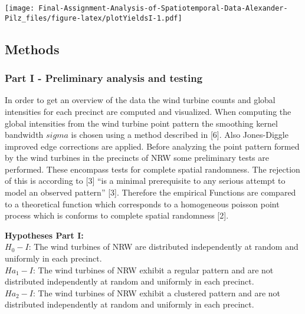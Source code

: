 \documentclass[
]{article}
\begin{document}
\texttt{[image: Final-Assignment-Analysis-of-Spatiotemporal-Data-Alexander-Pilz\_files/figure-latex/plotYieldsI-1.pdf]}

\hypertarget{methods}{%
\subsection{Methods}\label{methods}}

\hypertarget{part-i---preliminary-analysis-and-testing}{%
\subsubsection{Part I - Preliminary analysis and
testing}\label{part-i---preliminary-analysis-and-testing}}

In order to get an overview of the data the wind turbine counts and
global intensities for each precinct are computed and visualized. When
computing the global intensities from the wind turbine point pattern the
smoothing kernel bandwidth \(sigma\) is chosen using a method described
in {[}6{]}. Also Jones-Diggle improved edge corrections are applied.
Before analyzing the point pattern formed by the wind turbines in the
precincts of NRW some preliminary tests are performed. These encompass
tests for complete spatial randomness. The rejection of this is
according to {[}3{]} ``is a minimal prerequisite to any serious attempt
to model an observed pattern'' {[}3{]}. Therefore the empirical
Functions are compared to a theoretical function which corresponds to a
homogeneous poisson point process which is conforms to complete spatial
randomness {[}2{]}.

\textbf{Hypotheses Part I:}\\
\(H_{0} - I\): The wind turbines of NRW are distributed independently at
random and uniformly in each precinct.\\

\(Ha_{1} - I\): The wind turbines of NRW exhibit a regular pattern and
are not distributed independently at random and uniformly in each
precinct.\\

\(Ha_{2} - I\): The wind turbines of NRW exhibit a clustered pattern and
are not distributed independently at random and uniformly in each
precinct.\\
\end{document}
